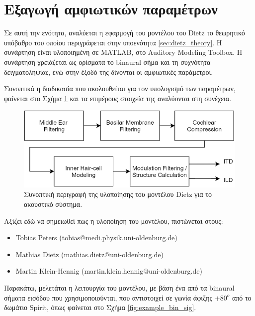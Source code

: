 \section{Εξαγωγή αμφιωτικών παραμέτρων}

\noindent
Σε αυτή την ενότητα, αναλύεται η εφαρμογή του μοντέλου του Dietz το θεωρητικό υπόβαθρο του οποίου περιγράφεται στην υποενότητα \ref{sec:dietz_theory}. Η συνάρτηση είναι υλοποιημένη σε MATLAB, στο Auditory Modeling Toolbox. Η συνάρτηση χρειάζεται ως ορίσματα το binaural σήμα και τη συχνότητα δειγματοληψίας, ενώ στην έξοδό της δίνονται οι αμφιωτικές παράμετροι.

Συνοπτικά η διαδικασία που ακολουθείται για τον υπολογισμό των παραμέτρων, φαίνεται στο Σχήμα \ref{fig:dietz_block_diagram_MATLAB} και τα επιμέρους στοιχεία της αναλύονται στη συνέχεια.

\begin{figure}[h]
  \centering
  \includegraphics[width=\textwidth]{images/dietz_block_diagram_MATLAB.png}
  \caption{Συνοπτική περιγραφή της υλοποίησης του μοντέλου Dietz για το ακουστικό σύστημα.}
  \label{fig:dietz_block_diagram_MATLAB}
\end{figure}

\noindent
Αξίζει εδώ να σημειωθεί πως η υλοποίηση του μοντέλου, πιστώνεται στους:
\begin{itemize}
    \item Tobias Peters (tobias@medi.physik.uni-oldenburg.de)
    \item Mathias Dietz (mathias.dietz@uni-oldenburg.de)
    \item Martin Klein-Hennig (martin.klein.hennig@uni-oldenburg.de)
\end{itemize}{}

Παρακάτω, μελετάται η λειτουργία του μοντέλου, με βάση ένα  από τα binaural σήματα εισόδου που χρησιμοποιούνται, που αντιστοιχεί σε γωνία άφιξης $+80^o$ από το δωμάτιο Spirit, όπως φαίνεται στο Σχήμα \ref{fig:example_bin_sig}.

